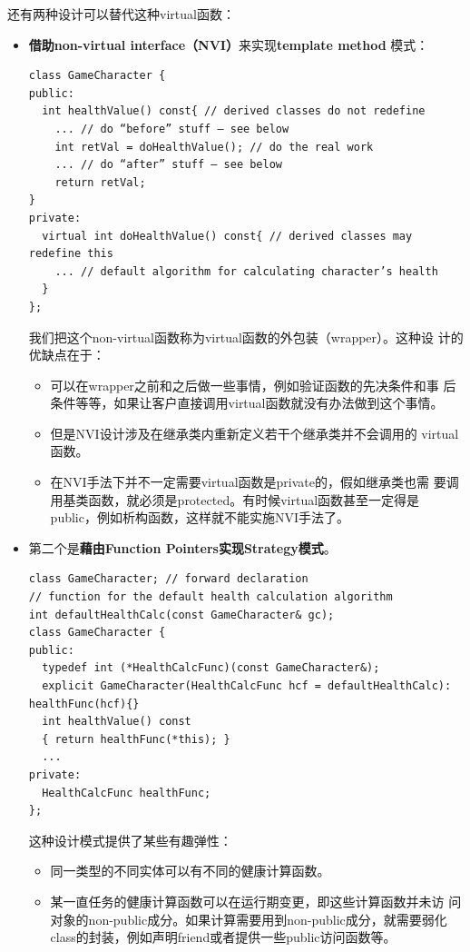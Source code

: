 还有两种设计可以替代这种virtual函数：
\begin{itemize}
\item \textbf{借助non-virtual interface（NVI）}来实现\textbf{template method}
  模式：
\begin{verbatim}
class GameCharacter {
public:
  int healthValue() const{ // derived classes do not redefine
    ... // do “before” stuff — see below
    int retVal = doHealthValue(); // do the real work
    ... // do “after” stuff — see below
    return retVal;
}
private:
  virtual int doHealthValue() const{ // derived classes may redefine this
    ... // default algorithm for calculating character’s health
  }
};
\end{verbatim}
  我们把这个non-virtual函数称为virtual函数的外包装（wrapper）。这种设
  计的优缺点在于：
  \begin{itemize}
  \item 可以在wrapper之前和之后做一些事情，例如验证函数的先决条件和事
    后条件等等，如果让客户直接调用virtual函数就没有办法做到这个事情。
  \item 但是NVI设计涉及在继承类内重新定义若干个继承类并不会调用的
    virtual函数。
  \item 在NVI手法下并不一定需要virtual函数是private的，假如继承类也需
    要调用基类函数，就必须是protected。有时候virtual函数甚至一定得是
    public，例如析构函数，这样就不能实施NVI手法了。
  \end{itemize}
  
\item 第二个是\textbf{藉由Function Pointers实现Strategy模式}。
\begin{verbatim}
class GameCharacter; // forward declaration
// function for the default health calculation algorithm
int defaultHealthCalc(const GameCharacter& gc);
class GameCharacter {
public:
  typedef int (*HealthCalcFunc)(const GameCharacter&);
  explicit GameCharacter(HealthCalcFunc hcf = defaultHealthCalc): healthFunc(hcf){}
  int healthValue() const
  { return healthFunc(*this); }
  ...
private:
  HealthCalcFunc healthFunc;
};
\end{verbatim}
  这种设计模式提供了某些有趣弹性：
  \begin{itemize}
  \item 同一类型的不同实体可以有不同的健康计算函数。
  \item 某一直任务的健康计算函数可以在运行期变更，即这些计算函数并未访
    问对象的non-public成分。如果计算需要用到non-public成分，就需要弱化
    class的封装，例如声明friend或者提供一些public访问函数等。 
  \end{itemize}


\end{itemize}
